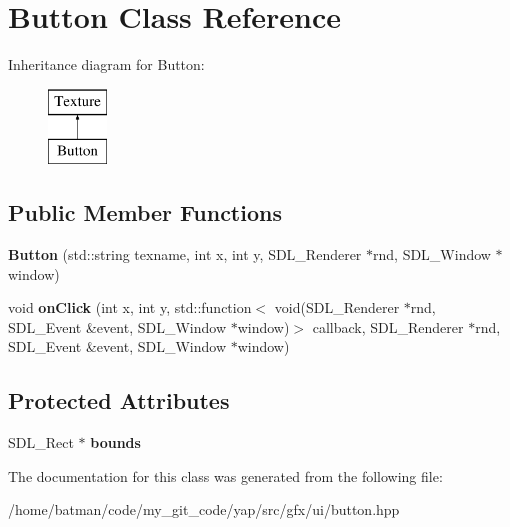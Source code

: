 \hypertarget{classButton}{}\section{Button Class Reference}
\label{classButton}
Inheritance diagram for Button\+:\begin{figure}[H]
\begin{center}
\leavevmode
\includegraphics[height=2.000000cm]{classButton}
\end{center}
\end{figure}
\subsection*{Public Member Functions}
\begin{DoxyCompactItemize}
\item 
\hypertarget{classButton_abe0413b847c42db7181f0ca54c3606d5}{}{\bfseries Button} (std\+::string texname, int x, int y, S\+D\+L\+\_\+\+Renderer $\ast$rnd, S\+D\+L\+\_\+\+Window $\ast$window)\label{classButton_abe0413b847c42db7181f0ca54c3606d5}

\item 
\hypertarget{classButton_a168e3e56188d3f5166e983fbbe9dd95f}{}void {\bfseries on\+Click} (int x, int y, std\+::function$<$ void(S\+D\+L\+\_\+\+Renderer $\ast$rnd, S\+D\+L\+\_\+\+Event \&event, S\+D\+L\+\_\+\+Window $\ast$window)$>$ callback, S\+D\+L\+\_\+\+Renderer $\ast$rnd, S\+D\+L\+\_\+\+Event \&event, S\+D\+L\+\_\+\+Window $\ast$window)\label{classButton_a168e3e56188d3f5166e983fbbe9dd95f}

\end{DoxyCompactItemize}
\subsection*{Protected Attributes}
\begin{DoxyCompactItemize}
\item 
\hypertarget{classButton_a34c86ea937a95ea66c4a0a60e08b4ae8}{}S\+D\+L\+\_\+\+Rect $\ast$ {\bfseries bounds}\label{classButton_a34c86ea937a95ea66c4a0a60e08b4ae8}

\end{DoxyCompactItemize}


The documentation for this class was generated from the following file\+:\begin{DoxyCompactItemize}
\item 
/home/batman/code/my\+\_\+git\+\_\+code/yap/src/gfx/ui/button.\+hpp\end{DoxyCompactItemize}
